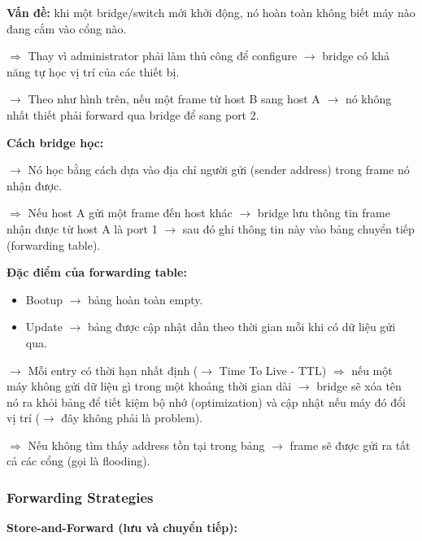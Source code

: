 \noindent
\textbf{Vấn đề:} khi một bridge/switch mới khởi động, nó hoàn toàn không biết máy nào đang cắm vào cổng nào.
\medskip

$\Rightarrow$ Thay vì administrator phải làm thủ công để configure $\rightarrow$ bridge có khả năng tự học vị trí của các thiết bị.
\medskip

\noindent
$\rightarrow$ Theo như hình trên, nếu một frame từ host B sang host A $\rightarrow$ nó không nhất thiết phải forward qua bridge để sang port 2.
\medskip

\vspace{0.5cm}

\noindent
\textbf{Cách bridge học:} 
\medskip

\noindent
$\rightarrow$ Nó học bằng cách dựa vào địa chỉ người gửi (sender address) trong frame nó nhận được.
\medskip

$\Rightarrow$ Nếu host A gửi một frame đến host khác $\rightarrow$ bridge lưu thông tin frame nhận được từ host A là port 1 $\rightarrow$ sau đó ghi thông tin này vào bảng chuyển tiếp (forwarding table).
\medskip

\noindent
\textbf{Đặc điểm của forwarding table:}

\begin{itemize}
    \item Bootup $\rightarrow$ bảng hoàn toàn empty.
    \item Update $\rightarrow$ bảng được cập nhật dần theo thời gian mỗi khi có dữ liệu gửi qua.
\end{itemize}
\medskip

\noindent
$\rightarrow$ Mỗi entry có thời hạn nhất định ($\rightarrow$ Time To Live - TTL) $\Rightarrow$ nếu một máy không gửi dữ liệu gì trong một khoảng thời gian dài $\rightarrow$ bridge sẽ xóa tên nó ra khỏi bảng để tiết kiệm bộ nhớ (optimization) và cập nhật nếu máy đó đổi vị trí ($\rightarrow$ đây không phải là problem).
\medskip

$\Rightarrow$ Nếu không tìm thấy address tồn tại trong bảng $\rightarrow$ frame sẽ được gửi ra tất cả các cổng (gọi là flooding).
\medskip

\subsubsection{Forwarding Strategies}


\noindent
\textbf{Store-and-Forward (lưu và chuyển tiếp):}
\medskip

